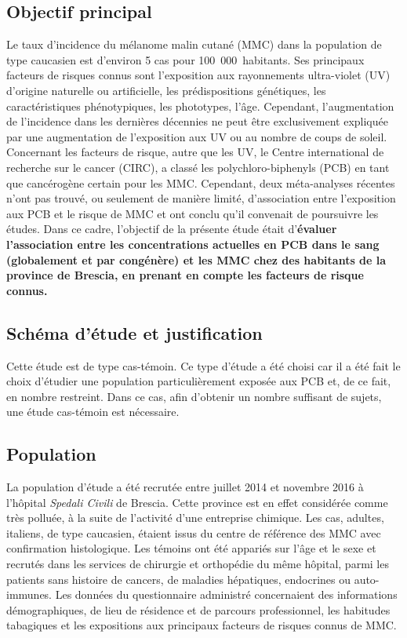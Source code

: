 \documentclass[10pt]{article}
\begin{document}
\subsection{Objectif principal}
Le taux d'incidence du mélanome malin cutané (MMC) dans la population de type caucasien est d'environ 5 cas pour 100~000~habitants. Ses principaux facteurs de risques connus sont l'exposition aux rayonnements ultra-violet (UV) d'origine naturelle ou artificielle, les prédispositions génétiques, les caractéristiques phénotypiques, les phototypes, l'âge. Cependant, l'augmentation de l'incidence dans les dernières décennies ne peut être exclusivement expliquée par une augmentation de l'exposition aux UV ou au nombre de coups de soleil. Concernant les facteurs de risque, autre que les UV, le Centre international de recherche sur le cancer (CIRC), a classé les polychloro-biphenyls (PCB) en tant que cancérogène certain pour les MMC.
Cependant, deux méta-analyses récentes n'ont pas trouvé, ou seulement de manière limité, d'association entre l'exposition aux PCB et le risque de MMC et ont conclu qu'il convenait de poursuivre les études. Dans ce cadre, l'objectif de la présente étude était d'\textbf{évaluer l'association entre les concentrations actuelles en PCB dans le sang (globalement et par congénère) et les MMC chez des habitants de la province de Brescia, en prenant en compte les facteurs de risque connus. }

\subsection{Schéma d'étude et justification}
Cette étude est de type cas-témoin. Ce type d'étude a été choisi car il a été fait le choix d'étudier une population particulièrement exposée aux PCB et, de ce fait, en nombre restreint. Dans ce cas, afin d'obtenir un nombre suffisant de sujets, une étude cas-témoin est nécessaire. 

\subsection{Population}
La population d'étude a été recrutée entre juillet 2014 et novembre 2016 à l'hôpital \emph{Spedali Civili} de Brescia. Cette province est en effet considérée comme très polluée, à la suite de l'activité d'une entreprise chimique. Les cas, adultes, italiens, de type caucasien, étaient issus du centre de référence des MMC avec confirmation histologique. Les témoins ont été appariés sur l'âge et le sexe et recrutés dans les services de chirurgie et orthopédie du même hôpital, parmi les patients sans histoire de cancers, de maladies hépatiques, endocrines ou auto-immunes. Les données du questionnaire administré concernaient des informations démographiques, de lieu de résidence et de parcours professionnel, les habitudes tabagiques et les expositions aux principaux facteurs de risques connus de MMC.
\end{document}
